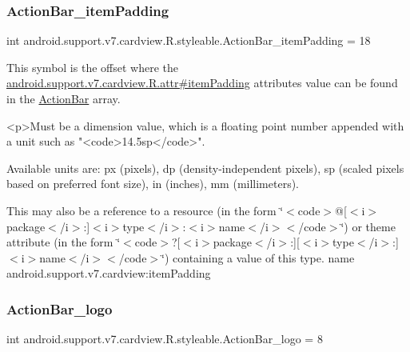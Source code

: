 \subsubsection{\texorpdfstring{Action\+Bar\+\_\+item\+Padding}{ActionBar\_itemPadding}}
{\footnotesize\ttfamily int android.\+support.\+v7.\+cardview.\+R.\+styleable.\+Action\+Bar\+\_\+item\+Padding = 18\hspace{0.3cm}{\ttfamily [static]}}

This symbol is the offset where the \hyperlink{classandroid_1_1support_1_1v7_1_1cardview_1_1R_1_1attr_a0d99f47cfd454bbcb9277b6e3440c206}{android.\+support.\+v7.\+cardview.\+R.\+attr\#item\+Padding} attribute\textquotesingle{}s value can be found in the \hyperlink{classandroid_1_1support_1_1v7_1_1cardview_1_1R_1_1styleable_a0cbf7f776e31f78bb0a2b558daf176f8}{Action\+Bar} array.

\begin{DoxyVerb}      <p>Must be a dimension value, which is a floating point number appended with a unit such as "<code>14.5sp</code>".
\end{DoxyVerb}
 Available units are\+: px (pixels), dp (density-\/independent pixels), sp (scaled pixels based on preferred font size), in (inches), mm (millimeters). 

This may also be a reference to a resource (in the form \char`\"{}$<$code$>$@\mbox{[}$<$i$>$package$<$/i$>$\+:\mbox{]}$<$i$>$type$<$/i$>$\+:$<$i$>$name$<$/i$>$$<$/code$>$\char`\"{}) or theme attribute (in the form \char`\"{}$<$code$>$?\mbox{[}$<$i$>$package$<$/i$>$\+:\mbox{]}\mbox{[}$<$i$>$type$<$/i$>$\+:\mbox{]}$<$i$>$name$<$/i$>$$<$/code$>$\char`\"{}) containing a value of this type.  name android.\+support.\+v7.\+cardview\+:item\+Padding \mbox{\label{classandroid_1_1support_1_1v7_1_1cardview_1_1R_1_1styleable_aa1f79988b3c132f89d1b38df0b419031}} 
\subsubsection{\texorpdfstring{Action\+Bar\+\_\+logo}{ActionBar\_logo}}
{\footnotesize\ttfamily int android.\+support.\+v7.\+cardview.\+R.\+styleable.\+Action\+Bar\+\_\+logo = 8\hspace{0.3cm}{\ttfamily [static]}}

